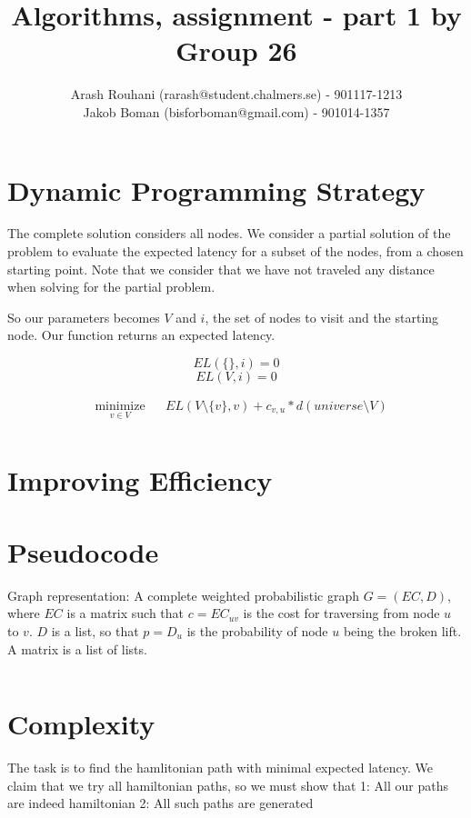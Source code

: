 \documentclass[a4paper,11pt]{article}
\title{Algorithms, assignment - part 1 by Group 26}
\author{Arash Rouhani (rarash@student.chalmers.se) - 901117-1213\\
        Jakob Boman (bisforboman@gmail.com) - 901014-1357}
\begin{document}
\maketitle

\section{Dynamic Programming Strategy}
The complete solution considers all nodes. We consider a partial solution
of the problem to evaluate the expected latency for a subset of the nodes,
from a chosen starting point. Note that we consider that we have not
traveled any distance when solving for the partial problem.

So our parameters becomes $V$ and $i$, the set of nodes to visit and the
starting node. Our function returns an expected latency.

$$ EL(\{\}, i) = 0 $$
$$ EL(V, i) = 0 $$

\begin{equation*}
\begin{aligned}
& \underset{v \in V}{\text{minimize}}
& & EL(V\setminus \{v\}, v) + c_{v,u} * d(universe\setminus V) \\
\end{aligned}
\end{equation*}

\section{Improving Efficiency}

\section{Pseudocode}
Graph representation: A complete weighted probabilistic graph $G = (EC, D)$, where $EC$ is a
matrix such that $c = EC_{uv}$ is the cost for traversing from node $u$ to $v$.
$D$ is a list, so that $p = D_u$ is the probability of node $u$ being the broken lift.
A matrix is a list of lists.

\begin{lstlisting}[mathescape]
\end{lstlisting}

\section{Complexity}
The task is to find the hamlitonian path with minimal expected latency.
We claim that we try all hamiltonian paths, so we must show that
1: All our paths are indeed hamiltonian
2: All such paths are generated
\end{document}

